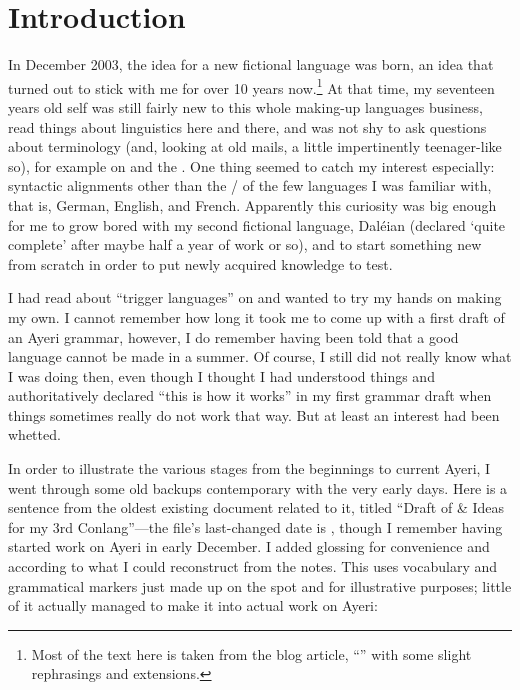 
\setcounter{chapter}{-1}
\chapter{Introduction}

In December 2003, the idea for a new fictional language was born, an idea that 
turned out to stick with me for over 10 years now.\footnote{Most of the text 
here is taken from the blog article, ``'' 
\parencite{benung:happybirthday} with some slight rephrasings and extensions.} 
At that time, my seventeen years old self was still fairly new to this whole 
making-up languages business, read things about linguistics here and there, and 
was not shy to ask questions about terminology (and, looking at old mails, a 
little impertinently teenager-like so), for example on  and the 
. One thing seemed to catch my interest especially: 
syntactic alignments other than the \Nom{}/\Acc{} of the few languages I was 
familiar with, that is, German, English, and French. Apparently this curiosity 
was big enough for me to grow bored with my second fictional language, Daléian 
(declared `quite complete' after maybe half a year of work or so), and to start 
something new from scratch in order to put newly acquired knowledge to test.

I had read about ``trigger languages'' on  and wanted to try my 
hands on making my own. I cannot remember how long it took me to come up with a 
first draft of an Ayeri grammar, however, I do remember having been told that a 
good language cannot be made in a summer. Of course, I still did not really 
know what I was doing then, even though I thought I had understood things and 
authoritatively declared ``this is how it works'' in my first grammar draft 
when things sometimes really do not work that way. But at least an interest had 
been whetted.

In order to illustrate the various stages from the beginnings to current Ayeri,
I went through some old backups contemporary with the very early days. 
Here is a sentence from the oldest existing document related to it, titled 
``Draft of \& Ideas for my 3rd Conlang''---the file's last-changed date is 
, though I remember having started work on Ayeri in early 
December. I added glossing for convenience and according to what I could 
reconstruct from the notes. This uses vocabulary and grammatical markers just 
made up on the spot and for illustrative purposes; little of it actually 
managed to make it into actual work on Ayeri:

